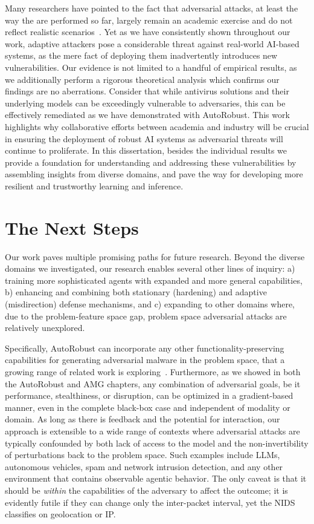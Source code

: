 Many researchers have pointed to the fact that adversarial attacks, at least the way the are performed so far, largely remain an academic exercise and do not reflect realistic scenarios~\cite{apruzzese2023real}.
Yet as we have consistently shown throughout our work, adaptive attackers pose a considerable threat against real-world AI-based systems, as the mere fact of deploying them inadvertently introduces new vulnerabilities.
Our evidence is not limited to a handful of empirical results, as we additionally perform a rigorous theoretical analysis which confirms our findings are no aberrations.
Consider that while antivirus solutions and their underlying models can be exceedingly vulnerable to adversaries, this can be effectively remediated as we have demonstrated with AutoRobust.
This work highlights why collaborative efforts between academia and industry will be crucial in ensuring the deployment of robust \gls{AI} systems as adversarial threats will continue to proliferate.
In this dissertation, besides the individual results we provide a foundation for understanding and addressing these vulnerabilities by assembling insights from diverse domains, and pave the way for developing more resilient and trustworthy learning and inference.

\section{The Next Steps}

Our work paves multiple promising paths for future research.
Beyond the diverse domains we investigated, our research enables several other lines of inquiry: a) training more sophisticated agents with expanded and more general capabilities, b) enhancing and combining both stationary (hardening) and adaptive (misdirection) defense mechanisms, and c) expanding to other domains where, due to the problem-feature space gap, problem space adversarial attacks are relatively unexplored.

Specifically, AutoRobust can incorporate any other functionality-preserving capabilities for generating adversarial malware in the problem space, that a growing range of related work is exploring~\cite{demetrio2021functionality, demetrio2021adversarial, labaca2021realizable, labaca2021aimed}.
Furthermore, as we showed in both the AutoRobust and AMG chapters, any combination of adversarial goals, be it performance, stealthiness, or disruption, can be optimized in a gradient-based manner, even in the complete black-box case and independent of modality or domain.
As long as there is feedback and the potential for interaction, our approach is extensible to a wide range of contexts where adversarial attacks are typically confounded by both lack of access to the model and the non-invertibility of perturbations back to the problem space.
Such examples include LLMs, autonomous vehicles, spam and network intrusion detection, and any other environment that contains observable agentic behavior.
The only caveat is that it should be \textit{within} the capabilities of the adversary to affect the outcome; it is evidently futile if they can change only the inter-packet interval, yet the \gls{NIDS} classifies on geolocation or IP.

